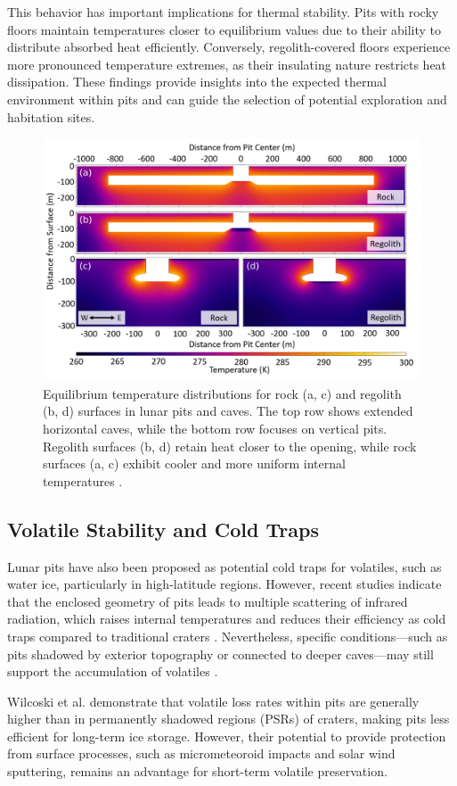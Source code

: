 This behavior has important implications for thermal stability. Pits with rocky floors maintain temperatures closer to equilibrium values due to their ability to distribute absorbed heat efficiently. Conversely, regolith-covered floors experience more pronounced temperature extremes, as their insulating nature restricts heat dissipation. These findings provide insights into the expected thermal environment within pits and can guide the selection of potential exploration and habitation sites.

\begin{figure}[H]
    \centering
    \includegraphics[width=0.75\linewidth]{thermal-simulation-lunar-pits-2d-regolith-rock.png}
    \caption{Equilibrium temperature distributions for rock (a, c) and regolith (b, d) surfaces in lunar pits and caves. The top row shows extended horizontal caves, while the bottom row focuses on vertical pits. Regolith surfaces (b, d) retain heat closer to the opening, while rock surfaces (a, c) exhibit cooler and more uniform internal temperatures \cite{thermal-lunar-pits}.}
    \label{fig:lunar-pit-equilibrium-temps}
\end{figure}


\subsection{Volatile Stability and Cold Traps}

Lunar pits have also been proposed as potential cold traps for volatiles, such as water ice, particularly in high-latitude regions. However, recent studies indicate that the enclosed geometry of pits leads to multiple scattering of infrared radiation, which raises internal temperatures and reduces their efficiency as cold traps compared to traditional craters \cite{newer-thermal}. Nevertheless, specific conditions—such as pits shadowed by exterior topography or connected to deeper caves—may still support the accumulation of volatiles \cite{newer-thermal, lunar-pits-numerical-modelling}.

Wilcoski et al. \cite{newer-thermal} demonstrate that volatile loss rates within pits are generally higher than in permanently shadowed regions (PSRs) of craters, making pits less efficient for long-term ice storage. However, their potential to provide protection from surface processes, such as micrometeoroid impacts and solar wind sputtering, remains an advantage for short-term volatile preservation.
